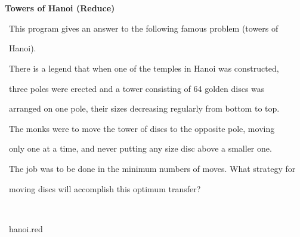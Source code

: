\documentclass[a4paper,10pt]{article}
\def\mc{\relax}
\begin{document}
\tt\mc 

\noindent
\mbox{}\rm\mc {\tt\%} \hrulefill
\tt\mc 

\noindent
\mbox{}\rm\mc {\tt\%} \ %
\tt\mc 

\noindent
\mbox{}\rm\mc {\tt\%} \ \centerline{\bf Towers of Hanoi (Reduce)}
\tt\mc 

\noindent
\mbox{}\rm\mc {\tt\%} 
\tt\mc 

\noindent
\mbox{}\rm\mc {\tt\%} \ \hspace{\leftmargini}This program gives an answer to the following famous problem (towers of
\tt\mc 

\noindent
\mbox{}\rm\mc {\tt\%} \ \hspace{\leftmargini}Hanoi).
\tt\mc 

\noindent
\mbox{}\rm\mc {\tt\%} \ \hspace{\leftmargini}There is a legend that when one of the temples in Hanoi was constructed,
\tt\mc 

\noindent
\mbox{}\rm\mc {\tt\%} \ \hspace{\leftmargini}three poles were erected and a tower consisting of 64 golden discs was
\tt\mc 

\noindent
\mbox{}\rm\mc {\tt\%} \ \hspace{\leftmargini}arranged on one pole, their sizes decreasing regularly from bottom to top.
\tt\mc 

\noindent
\mbox{}\rm\mc {\tt\%} \ \hspace{\leftmargini}The monks were to move the tower of discs to the opposite pole, moving
\tt\mc 

\noindent
\mbox{}\rm\mc {\tt\%} \ \hspace{\leftmargini}only one at a time, and never putting any size disc above a smaller one.
\tt\mc 

\noindent
\mbox{}\rm\mc {\tt\%} \ \hspace{\leftmargini}The job was to be done in the minimum numbers of moves. What strategy for
\tt\mc 

\noindent
\mbox{}\rm\mc {\tt\%} \ \hspace{\leftmargini}moving discs will accomplish this optimum transfer?
\tt\mc 

\noindent
\mbox{}\rm\mc {\tt\%} \ %
\tt\mc 

\noindent
\mbox{}\rm\mc {\tt\%} \hrulefill\ hanoi.red \ \hrulefill
\tt\mc 

\noindent
\mbox{}\hfill
\end{document}
